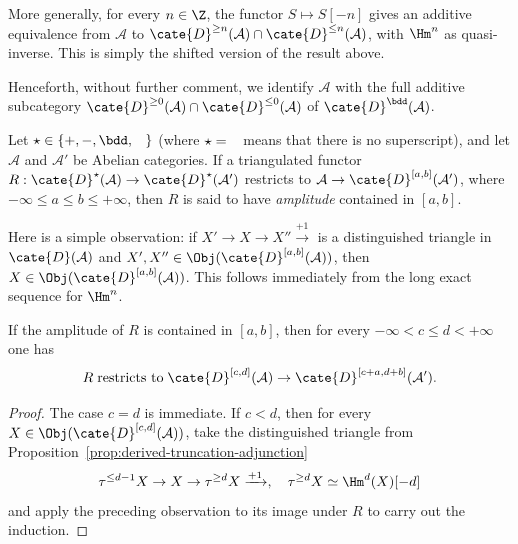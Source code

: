 More generally, for every $n\in\Z$, the functor $S\mapsto S[-n]$ gives an
additive equivalence from $\mathcal{A}$ to
$\cate{D}^{\geq n}(\mathcal{A})\cap\cate{D}^{\leq n}(\mathcal{A})$, with
$\Hm^n$ as quasi-inverse. This is simply the shifted version of the result
above.

Henceforth, without further comment, we identify $\mathcal{A}$ with the full
additive subcategory
$\cate{D}^{\geq0}(\mathcal{A})\cap\cate{D}^{\leq0}(\mathcal{A})$ of
$\cate{D}^{\bdd}(\mathcal{A})$.

\begin{definition}\label{def:functor-amplitude}
	Let $\star\in\{+,-,\bdd,\hspace{0.8em}\}$ (where
	$\star=\hspace{0.8em}$ means that there is no superscript), and let
	$\mathcal{A}$ and $\mathcal{A}'$ be Abelian categories. If a
	triangulated functor
	$R:\cate{D}^\star(\mathcal{A})\to\cate{D}^\star(\mathcal{A}')$
	restricts to
	$\mathcal{A}\to\cate{D}^{[a,b]}(\mathcal{A}')$, where
	$-\infty\leq a\leq b\leq+\infty$, then $R$ is said to have
	\emph{amplitude} contained in $[a,b]$.
\end{definition}

Here is a simple observation: if
$X'\to X\to X''\xrightarrow{+1}$ is a distinguished triangle in
$\cate{D}(\mathcal{A})$ and
$X',X''\in\Obj(\cate{D}^{[a,b]}(\mathcal{A}))$, then
$X\in\Obj(\cate{D}^{[a,b]}(\mathcal{A}))$. This follows immediately from
the long exact sequence for $\Hm^n$.

\begin{lemma}\label{prop:amplitude-translate}
	If the amplitude of $R$ is contained in $[a,b]$, then for every
	$-\infty<c\leq d<+\infty$ one has
	\[ R\;\text{restricts to}\;\cate{D}^{[c,d]}(\mathcal{A})\to\cate{D}^{[c+a,d+b]}(\mathcal{A}'). \]
\end{lemma}

\begin{proof}
	The case $c=d$ is immediate. If $c<d$, then for every
	$X\in\Obj(\cate{D}^{[c,d]}(\mathcal{A}))$, take the distinguished
	triangle from Proposition~\ref{prop:derived-truncation-adjunction}
	\[ \tau^{\leq d-1}X\to X\to\tau^{\geq d}X\xrightarrow{+1},\quad \tau^{\geq d}X\simeq\Hm^d(X)[-d] \]
	and apply the preceding observation to its image under $R$ to carry out
	the induction.
\end{proof}

